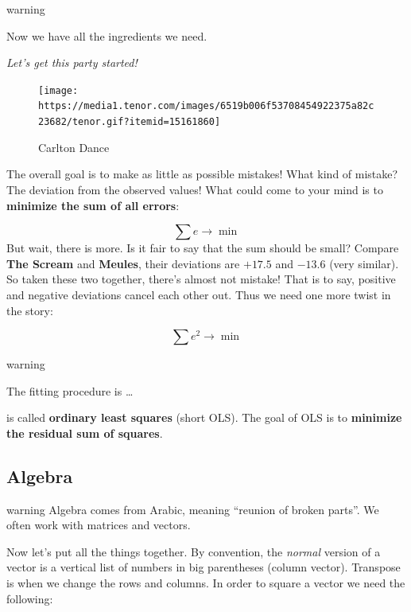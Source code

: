 \documentclass[
]{book}
\begin{document}
\begin{infobox}warning

Now we have all the ingredients we need.

\emph{Let's get this party started!}

\begin{figure}
\centering
\texttt{[image: https://media1.tenor.com/images/6519b006f53708454922375a82c23682/tenor.gif?itemid=15161860]}
\caption{Carlton Dance}
\end{figure}

\end{infobox}

The overall goal is to make as little as possible mistakes! What kind of mistake? The deviation from the observed values! What could come to your mind is to \textbf{minimize the sum of all errors}:

\[\sum e \rightarrow \min\]
But wait, there is more. Is it fair to say that the sum should be small? Compare \textbf{The Scream} and \textbf{Meules}, their deviations are \(+17.5\) and \(-13.6\) (very similar). So taken these two together, there's almost not mistake! That is to say, positive and negative deviations cancel each other out. Thus we need one more twist in the story:

\[\sum e^2 \rightarrow \min\]

\begin{infobox}warning

The fitting procedure is \ldots{}

is called \textbf{ordinary least squares} (short OLS). The goal of OLS is to \textbf{minimize the residual sum of squares}.

\end{infobox}

\hypertarget{algebra}{%
\subsection{Algebra}\label{algebra}}

\begin{infobox}warning
Algebra comes from Arabic, meaning ``reunion of broken parts''. We often work with matrices and vectors.

\end{infobox}

Now let's put all the things together. By convention, the \emph{normal} version of a vector is a vertical list of numbers in big parentheses (column vector). Transpose is when we change the rows and columns. In order to square a vector we need the following:
\end{document}
